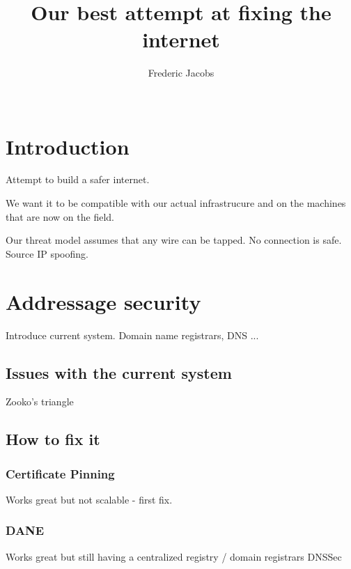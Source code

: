 \documentclass{vldb}
\begin{document}
\title{Our best attempt at fixing the internet}



\author{
\alignauthor
Frederic Jacobs\\
       \\
}

\maketitle

\begin{abstract}

\end{abstract}

\section{Introduction}

Attempt to build a safer internet.

We want it to be compatible with our actual infrastrucure and on the machines that are now on the field.

Our threat model assumes that any wire can be tapped. No connection is safe. Source IP spoofing.


\section{Addressage security}

Introduce current system. Domain name registrars, DNS ... 

\subsection{ Issues with the current system} 
Zooko's triangle
\subsection{How to fix it}
\subsubsection{Certificate Pinning}
Works great but not scalable - first fix.
\subsubsection{DANE}
Works great but still having a centralized registry / domain registrars
DNSSec
\end{document}
